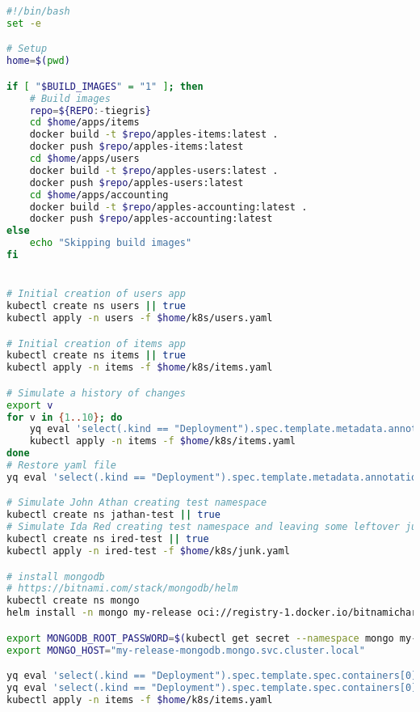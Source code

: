 \begin{lstlisting}[caption={initial-setup.sh},language=bash,label=appendix:csr:setup]
#!/bin/bash
set -e

# Setup
home=$(pwd)

if [ "$BUILD_IMAGES" = "1" ]; then
    # Build images
    repo=${REPO:-tiegris}
    cd $home/apps/items
    docker build -t $repo/apples-items:latest .
    docker push $repo/apples-items:latest
    cd $home/apps/users
    docker build -t $repo/apples-users:latest .
    docker push $repo/apples-users:latest
    cd $home/apps/accounting
    docker build -t $repo/apples-accounting:latest .
    docker push $repo/apples-accounting:latest
else
    echo "Skipping build images"
fi


# Initial creation of users app
kubectl create ns users || true
kubectl apply -n users -f $home/k8s/users.yaml

# Initial creation of items app
kubectl create ns items || true
kubectl apply -n items -f $home/k8s/items.yaml

# Simulate a history of changes
export v
for v in {1..10}; do
    yq eval 'select(.kind == "Deployment").spec.template.metadata.annotations.v = env(v)' $home/k8s/items.yaml -i
    kubectl apply -n items -f $home/k8s/items.yaml
done
# Restore yaml file
yq eval 'select(.kind == "Deployment").spec.template.metadata.annotations.v = "0"' $home/k8s/items.yaml -i

# Simulate John Athan creating test namespace
kubectl create ns jathan-test || true
# Simulate Ida Red creating test namespace and leaving some leftover junk in it
kubectl create ns ired-test || true
kubectl apply -n ired-test -f $home/k8s/junk.yaml

# install mongodb
# https://bitnami.com/stack/mongodb/helm
kubectl create ns mongo
helm install -n mongo my-release oci://registry-1.docker.io/bitnamicharts/mongodb

export MONGODB_ROOT_PASSWORD=$(kubectl get secret --namespace mongo my-release-mongodb -o jsonpath="{.data.mongodb-root-password}" | base64 -d)
export MONGO_HOST="my-release-mongodb.mongo.svc.cluster.local"

yq eval 'select(.kind == "Deployment").spec.template.spec.containers[0].env[0].value = env(MONGODB_ROOT_PASSWORD)' $home/k8s/items.yaml -i
yq eval 'select(.kind == "Deployment").spec.template.spec.containers[0].env[1].value = env(MONGO_HOST)' $home/k8s/items.yaml -i
kubectl apply -n items -f $home/k8s/items.yaml
\end{lstlisting}

